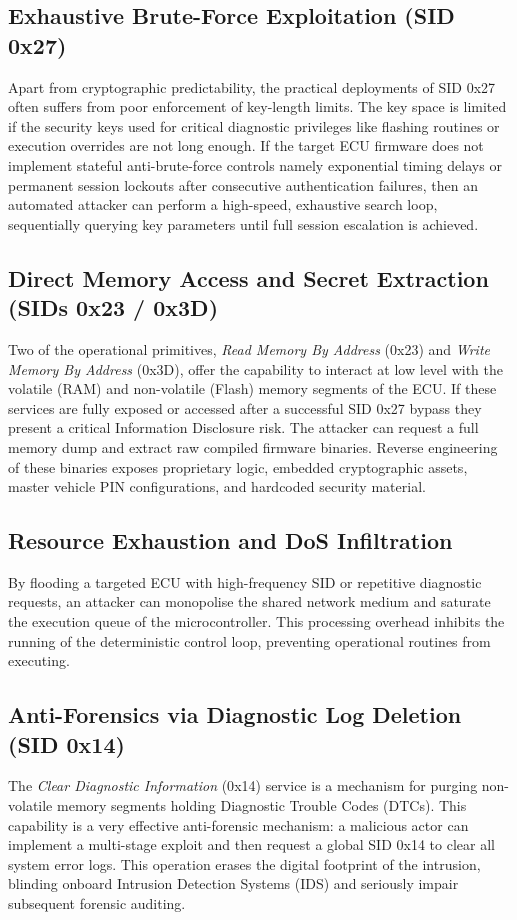 \subsection{Exhaustive Brute-Force Exploitation (SID 0\textnormal{x}27)}
Apart from cryptographic predictability, the practical deployments of \gls{SID} 0\textnormal{x}27 often suffers from poor enforcement of key-length limits. The key space is limited if the security keys used for critical diagnostic privileges like flashing routines or execution overrides are not long enough. If the target \gls{ECU} firmware does not implement stateful anti-brute-force controls namely exponential timing delays or permanent session lockouts after consecutive authentication failures, then an automated attacker can perform a high-speed, exhaustive search loop, sequentially querying key parameters until full session escalation is achieved.

\subsection{Direct Memory Access and Secret Extraction (SIDs 0\textnormal{x}23 / 0\textnormal{x}3D)}
Two of the operational primitives, \textit{Read Memory By Address} (0\textnormal{x}23) and \textit{Write Memory By Address} (0\textnormal{x}3D), offer the capability to interact at low level with the volatile (\gls{RAM}) and non-volatile (Flash) memory segments of the \gls{ECU}. If these services are fully exposed or accessed after a successful \gls{SID} 0\textnormal{x}27 bypass they present a critical Information Disclosure risk. The attacker can request a full memory dump and extract raw compiled firmware binaries. Reverse engineering of these binaries exposes proprietary logic, embedded cryptographic assets, master vehicle PIN configurations, and hardcoded security material.

\subsection{Resource Exhaustion and DoS Infiltration}
By flooding a targeted \gls{ECU} with high-frequency \gls{SID} or repetitive diagnostic requests, an attacker can monopolise the shared network medium and saturate the execution queue of the microcontroller. This processing overhead inhibits the running of the deterministic control loop, preventing operational routines from executing.

\subsection{Anti-Forensics via Diagnostic Log Deletion (SID 0\textnormal{x}14)}
The \textit{Clear Diagnostic Information} (0\textnormal{x}14) service is a mechanism for purging non-volatile memory segments holding Diagnostic Trouble Codes (\glspl{DTC}). This capability is a very effective anti-forensic mechanism: a malicious actor can implement a multi-stage exploit and then request a global \gls{SID} 0\textnormal{x}14 to clear all system error logs. This operation erases the digital footprint of the intrusion, blinding onboard Intrusion Detection Systems (\gls{IDS}) and seriously impair subsequent forensic auditing.

